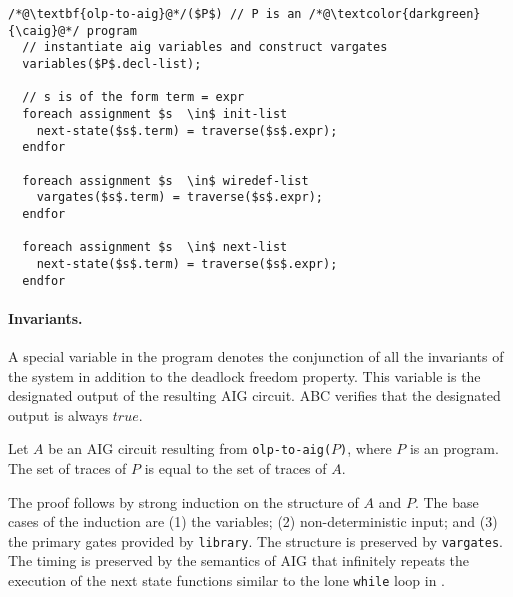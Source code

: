 \begin{lstlisting}
/*@\textbf{olp-to-aig}@*/($P$) // P is an /*@\textcolor{darkgreen}{\caig}@*/ program
  // instantiate aig variables and construct vargates
  variables($P$.decl-list); 
  
  // s is of the form term = expr 
  foreach assignment $s  \in$ init-list 
    next-state($s$.term) = traverse($s$.expr);  
  endfor
  
  foreach assignment $s  \in$ wiredef-list
    vargates($s$.term) = traverse($s$.expr);  
  endfor
  
  foreach assignment $s  \in$ next-list
    next-state($s$.term) = traverse($s$.expr);  
  endfor
\end{lstlisting}


\paragraph{Invariants.}
A special variable in the \caig program denotes the conjunction of all the invariants of the system in addition to the deadlock freedom property. This variable is the designated output of the resulting 
AIG circuit. ABC verifies that the designated output is always $true$. 


\begin{theorem}
Let $A$ be an AIG circuit resulting from \texttt{olp-to-aig($P$)}, where $P$ is an \caig program. The set of traces of $P$ is equal to the set of traces of $A$.
\end{theorem} 
The proof follows by strong induction on the structure of $A$ and $P$. 
The base cases of the induction are 
(1) the variables;
(2) non-deterministic input; and 
(3) the primary gates provided by \texttt{library}. 
The structure is preserved by \texttt{vargates}. 
The timing is preserved by the semantics of AIG that infinitely repeats the execution of the 
next state functions similar to the lone \texttt{while} loop in \caig.
